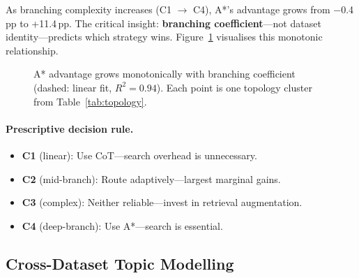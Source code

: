 \documentclass{article}
\newcommand{\pp}{\,pp\xspace}
\begin{document}
As branching complexity increases (C1 $\rightarrow$ C4), A*'s advantage grows
from $-$0.4\pp to +11.4\pp.  The critical insight: \textbf{branching
coefficient}---not dataset identity---predicts which strategy wins.
Figure~\ref{fig:bc_advantage} visualises this monotonic relationship.

\begin{figure}[t]
\centering
{}
\caption{A* advantage grows monotonically with branching coefficient (dashed:
linear fit, $R^2{=}0.94$).  Each point is one topology cluster from
Table~\ref{tab:topology}.}
\label{fig:bc_advantage}
\end{figure}

\paragraph{Prescriptive decision rule.}
\begin{itemize}[leftmargin=1.5em,itemsep=2pt]
\item \textbf{C1} (linear): Use CoT---search overhead is unnecessary.
\item \textbf{C2} (mid-branch): Route adaptively---largest marginal gains.
\item \textbf{C3} (complex): Neither reliable---invest in retrieval
augmentation.
\item \textbf{C4} (deep-branch): Use A*---search is essential.
\end{itemize}

\subsection{Cross-Dataset Topic Modelling}
\label{sec:topic}
\end{document}
